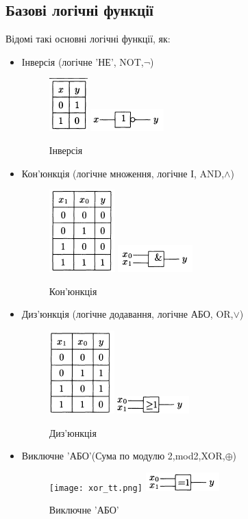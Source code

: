 \subsection{Базові логічні функції}
Відомі такі основні логічні функції, як:
\begin{itemize}
	\item Інверсія (логічне  'НЕ', NOT,$\lnot$)
	\begin{figure}[h!]
 	\includegraphics[scale=1]{inverter_tt.png}
 	\includegraphics[scale=1]{inverter_sign.png}
 	\centering
	\caption{Інверсія}\label{fig:inverter}
	\end{figure}
	\item Кон'юнкція (логічне множення, логічне  І, AND,$\wedge$)
	\begin{figure}[h!]
 	\includegraphics[scale=1]{and_tt.png}
 	\includegraphics[scale=1]{and_sign.png}
 	\centering
	\caption{Кон'юнкція}\label{fig:and}
	\end{figure}
	\item Диз'юнкція (логічне додавання, логічне  АБО, OR,$\lor$)
	\begin{figure}[h!]
 	\includegraphics[scale=1]{or_tt.png}
 	\includegraphics[scale=1]{or_sign.png}
 	\centering
	\caption{Диз'юнкція}\label{fig:or}
	\end{figure}
	\item Виключне 'АБО'(Сума по модулю 2,mod2,XOR,$\oplus$)
	\begin{figure}[h!]
 	\texttt{[image: xor\_tt.png]}
 	\includegraphics[scale=1]{xor_sign.png}
 	\centering
	\caption{Виключне 'АБО'}\label{fig:xor}
	\end{figure}
\end{itemize}
